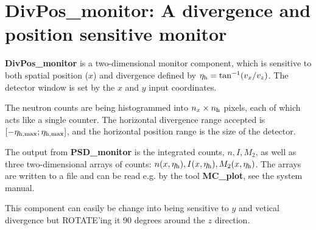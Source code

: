 
\section{DivPos\_monitor: A divergence and position sensitive monitor}

{\bf DivPos\_monitor} is a two-dimensional monitor component,
which is sensitive to both spatial position ($x$) and divergence 
defined by $\eta_{\rm h} = \tan^{-1}(v_x/v_z)$.
The detector window is set
by the $x$ and $y$ input coordinates.

The neutron counts are being histogrammed
into $n_x \times n_{\rm h}$ pixels, each of which acts like a single
counter. The horizontal divergence range accepted is 
$[-\eta_{\rm h,max}; \eta_{\rm h,max}]$, and the horizontal position
range is the size of the detector.

The output from {\bf PSD\_monitor} is the integrated counts, $n, I, M_2$, 
as well as 
three two-dimensional arrays of counts: $n(x,\eta_{\rm h}), 
I(x,\eta_{\rm h}), M_2(x,\eta_{\rm h})$.
The arrays are written to a file and can be read e.g. by the tool
{\bf MC\_plot}, see the system manual.

This component can easily be change into being sensitive
to $y$ and vetical divergence but ROTATE'ing it 
90 degrees around the $z$ direction.